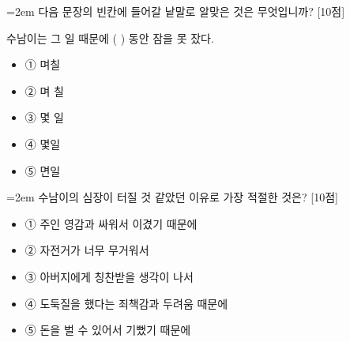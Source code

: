 \documentclass[12pt,a4paper]{article}
\newcommand{\qnum}[1]{%
  \tikz[baseline=(num.base)]{%
    \node[circle, fill=numCircle, text=white, inner sep=0pt,
          minimum size=18pt, font=\small\bfseries] (num) {#1};%
  }%
}
\newcommand{\pts}[1]{%
  \hfill\textcolor{ptsBadge}{[#1점]}%
}
\begin{document}
\vspace{4mm}
\begin{minipage}{\columnwidth}
{\hangindent=2em
\qnum{3}\enspace 다음 문장의 빈칸에 들어갈 낱말로 알맞은 것은 무엇입니까? \pts{10}
\par}

\vspace{3mm}
\begin{tcolorbox}[bogi]
수남이는 그 일 때문에 (          ) 동안 잠을 못 잤다.
\end{tcolorbox}
\vspace{3mm}
\begin{itemize}[leftmargin=2.5em, labelsep=0.3em, label={}, itemsep=4pt, parsep=1pt, topsep=0pt]
  \item ① 며칠
  \item ② 며 칠
  \item ③ 몇 일
  \item ④ 몇일
  \item ⑤ 면일
\end{itemize}
\end{minipage}
\vspace{4mm}

\vspace{4mm}
\begin{minipage}{\columnwidth}
{\hangindent=2em
\qnum{4}\enspace 수남이의 심장이 터질 것 같았던 이유로 가장 적절한 것은? \pts{10}
\par}

\vspace{3mm}
\begin{itemize}[leftmargin=2.5em, labelsep=0.3em, label={}, itemsep=4pt, parsep=1pt, topsep=0pt]
  \item ① 주인 영감과 싸워서 이겼기 때문에
  \item ② 자전거가 너무 무거워서
  \item ③ 아버지에게 칭찬받을 생각이 나서
  \item ④ 도둑질을 했다는 죄책감과 두려움 때문에
  \item ⑤ 돈을 벌 수 있어서 기뻤기 때문에
\end{itemize}
\end{minipage}
\vspace{4mm}
\end{document}
